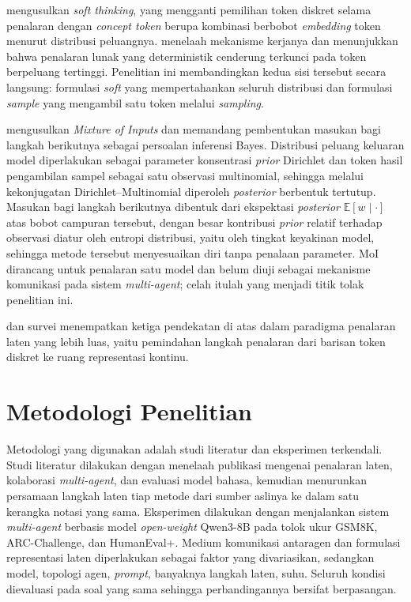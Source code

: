 \citet{softthinking} mengusulkan \textit{soft thinking}, yang mengganti
pemilihan token diskret selama penalaran dengan \textit{concept token} berupa
kombinasi berbobot \textit{embedding} token menurut distribusi peluangnya.
\citet{stochsoft} menelaah mekanisme kerjanya dan menunjukkan bahwa penalaran
lunak yang deterministik cenderung terkunci pada token berpeluang tertinggi.
Penelitian ini membandingkan kedua sisi tersebut secara langsung: formulasi
\textit{soft} yang mempertahankan seluruh distribusi dan formulasi
\textit{sample} yang mengambil satu token melalui \textit{sampling}.

\citet{moi} mengusulkan \textit{Mixture of Inputs} dan memandang pembentukan
masukan bagi langkah berikutnya sebagai persoalan inferensi Bayes. Distribusi
peluang keluaran model diperlakukan sebagai parameter konsentrasi
\textit{prior} Dirichlet dan token hasil pengambilan sampel sebagai satu
observasi multinomial, sehingga melalui kekonjugatan Dirichlet--Multinomial
diperoleh \textit{posterior} berbentuk tertutup. Masukan bagi langkah
berikutnya dibentuk dari ekspektasi \textit{posterior} $\mathbb{E}[w\mid\cdot]$
atas bobot campuran tersebut, dengan besar kontribusi \textit{prior} relatif
terhadap observasi diatur oleh entropi distribusi, yaitu oleh tingkat
keyakinan model, sehingga metode tersebut menyesuaikan diri tanpa penalaan
parameter. MoI dirancang untuk penalaran satu model dan belum diuji sebagai
mekanisme komunikasi pada sistem \textit{multi-agent}; celah itulah yang
menjadi titik tolak penelitian ini.

\citet{coconut} dan survei \citet{latentsurvey} menempatkan ketiga pendekatan
di atas dalam paradigma penalaran laten yang lebih luas, yaitu pemindahan
langkah penalaran dari barisan token diskret ke ruang representasi kontinu.


\section{Metodologi Penelitian}

Metodologi yang digunakan adalah studi literatur dan eksperimen terkendali.
Studi literatur dilakukan dengan menelaah publikasi mengenai penalaran laten,
kolaborasi \textit{multi-agent}, dan evaluasi model bahasa, kemudian
menurunkan persamaan langkah laten tiap metode dari sumber aslinya ke dalam
satu kerangka notasi yang sama. Eksperimen dilakukan dengan menjalankan sistem
\textit{multi-agent} berbasis model \textit{open-weight} Qwen3-8B pada tolok
ukur GSM8K, ARC-Challenge, dan HumanEval+. Medium komunikasi antaragen dan
formulasi representasi laten diperlakukan sebagai faktor yang divariasikan,
sedangkan model, topologi agen, \textit{prompt}, banyaknya langkah laten,
suhu. Seluruh kondisi dievaluasi pada soal yang sama sehingga perbandingannya bersifat berpasangan.


